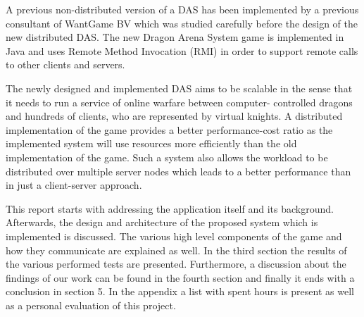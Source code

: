 \documentclass{article}
\begin{document}
A previous non-distributed version of a DAS has been implemented by a previous consultant of WantGame BV which was studied carefully before the design of the new distributed DAS.
The new Dragon Arena System game is implemented in Java and uses Remote Method Invocation (RMI) in order to support remote calls to other clients and servers.

The newly designed and implemented DAS aims to be scalable in the sense that it needs to run a service of online warfare between computer- controlled dragons and hundreds of clients, who are represented by virtual knights. 
A distributed implementation of the game provides a better performance-cost ratio as the implemented system will use resources more efficiently than the old implementation of the game.
Such a system also allows the workload to be distributed over multiple server nodes which leads to a better performance than in just a client-server approach.

This report starts with addressing the application itself and its background.
Afterwards, the design and architecture of the proposed system which is implemented is discussed.
The various high level components of the game and how they communicate are explained as well.
In the third section the results of the various performed tests are presented. 
Furthermore, a discussion about the findings of our work can be found in the fourth section and finally it ends with a conclusion in section 5. In the appendix a list with spent hours is present as well as a personal evaluation of this project.

\newpage









  



\nocite{*}


\end{document}
